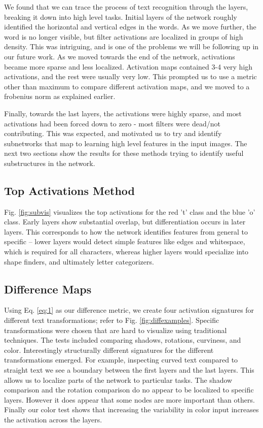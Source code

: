 \documentclass[10pt,twocolumn,letterpaper]{article}
\begin{document}
We found that we can trace the process of text recognition through the layers, breaking it down into high level tasks. Initial layers of the network roughly identified the horizontal and vertical edges in the words. As we move further, the word is no longer visible, but filter activations are localized in groups of high density. This was intriguing, and is one of the problems we will be following up in our future work. As we moved towards the end of the network, activations became more sparse and less localized. Activation maps contained 3-4 very high activations, and the rest were usually very low. This prompted us to use a metric other than maximum to compare different activation maps, and we moved to a frobenius norm as explained earlier. 

Finally, towards the last layers, the activations were highly sparse, and most activations had been forced down to zero - most filters were dead/not contributing. This was expected, and motivated us to try and identify subnetworks that map to learning high level features in the input images. The next two sections show the results for these methods trying to identify useful substructures in the network.

\subsection{Top Activations Method}
Fig. \ref{fig:subvis} visualizes the top activations for the red 't' class and the blue 'o' class. Early layers show substantial overlap, but differentiation occurs in later layers. This corresponds to how the network identifies features from general to specific -- lower layers would detect simple features like edges and whitespace, which is required for all characters, whereas higher layers would specialize into shape finders, and ultimately letter categorizers. 

\subsection{Difference Maps}
Using Eq. \ref{eq:1} as our difference metric, we create four activation signatures for different text transformations; refer to Fig. \ref{fig:diffexamples}. Specific transformations were chosen that are hard to visualize using traditional techniques. The tests included comparing shadows, rotations, curviness, and color. Interestingly structurally different signatures for the different transformations emerged. For example, inspecting curved text compared to straight text we see a boundary between the first layers and the last layers. This allows us to localize parts of the network to particular tasks. The shadow comparison and the rotation comparison do no appear to be localized to specific layers. However it does appear that some nodes are more important than others. Finally our color test shows that increasing the variability in color input increases the activation across the layers.
\end{document}
